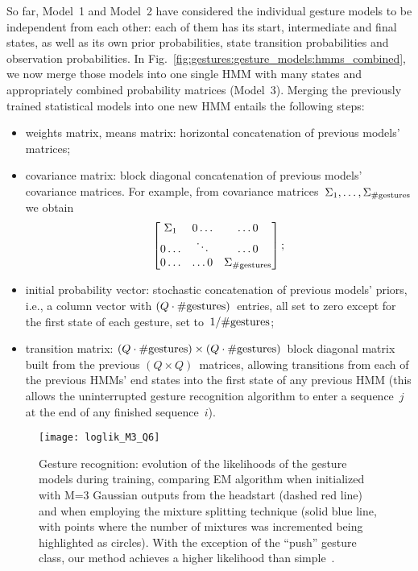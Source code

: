 So far, Model~1 and Model~2 have considered the individual gesture models to be independent from each other: each of them has its start, intermediate and final states, as well as its own prior probabilities, state transition probabilities and observation probabilities.
In Fig.~\ref{fig:gestures:gesture_models:hmms_combined}, we now merge those models into one single \ac{HMM} with many states and appropriately combined probability matrices (Model~3).
Merging the previously trained statistical models into one new \ac{HMM} entails the following steps:
\begin{itemize}
\item weights matrix, means matrix: horizontal concatenation of previous models' matrices;

\item covariance matrix: block diagonal concatenation of previous models' covariance matrices. For example, from covariance matrices~$\Sigma_1, \dots, \Sigma_{\text{\#gestures}}$ we obtain
      \begin{equation*}
      \begin{bmatrix}
      \Sigma_1 & 0\dots  & \dots0 \\
      0\dots  & \ddots & \dots0 \\
      0\dots  & \dots0  & \Sigma_{\text{\#gestures}}
      \end{bmatrix};
      \end{equation*}

\item initial probability vector: stochastic concatenation of previous models' priors, i.e., a column vector with $(Q\cdot\text{\#gestures})$~entries, all set to zero except for the first state of each gesture, set to~$1/\text{\#gestures}$;

\item transition matrix: $(Q\cdot\text{\#gestures}) \times (Q\cdot\text{\#gestures})$~block diagonal matrix built from the previous $(Q \times Q)$~matrices, allowing transitions from each of the previous \acp{HMM}' end states into the first state of any previous \ac{HMM} (this allows the uninterrupted gesture recognition algorithm to enter a sequence~$j$ at the end of any finished sequence~$i$).
\end{itemize}

\begin{figure}
\texttt{[image: loglik\_M3\_Q6]}
\caption[Gesture recognition: evolution of the likelihoods of the gesture models during training.]{Gesture recognition: evolution of the likelihoods of the gesture models during training, comparing \ac{EM} algorithm when initialized with M=3 Gaussian outputs from the headstart (dashed red line) and when employing the mixture splitting technique (solid blue line, with points where the number of mixtures was incremented being highlighted as circles).
With the exception of the ``push'' gesture class, our method achieves a higher likelihood than simple~\EM.}
\label{fig:gestures:loglik}
\end{figure}

